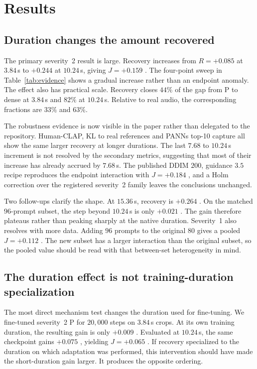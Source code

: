 \section{Results}
\subsection{Duration changes the amount recovered}
The primary severity~2 result is large. Recovery increases from $R=+0.085$  at $3.84$\,s to $+0.244$  at $10.24$\,s, giving $J=+0.159$ . The four-point sweep in Table~\ref{tab:evidence} shows a gradual increase rather than an endpoint anomaly. The effect also has practical scale. Recovery closes $44\%$ of the gap from P to dense at $3.84$\,s and $82\%$ at $10.24$\,s. Relative to real audio, the corresponding fractions are $33\%$ and $63\%$.

The robustness evidence is now visible in the paper rather than delegated to the repository. Human-CLAP, KL to real references and PANNs top-10 capture all show the same larger recovery at longer durations. The last $7.68$ to $10.24$\,s increment is not resolved by the secondary metrics, suggesting that most of their increase has already accrued by $7.68$\,s. The published DDIM $200$, guidance $3.5$ recipe reproduces the endpoint interaction with $J=+0.184$ , and a Holm correction over the registered severity~2 family leaves the conclusions unchanged.

Two follow-ups clarify the shape. At $15.36$\,s, recovery is $+0.264$ . On the matched $96$-prompt subset, the step beyond $10.24$\,s is only $+0.021$ . The gain therefore plateaus rather than peaking sharply at the native duration. Severity~1 also resolves with more data. Adding $96$ prompts to the original $80$ gives a pooled $J=+0.112$ . The new subset has a larger interaction than the original subset, so the pooled value should be read with that between-set heterogeneity in mind.

\subsection{The duration effect is not training-duration specialization}
The most direct mechanism test changes the duration used for fine-tuning. We fine-tuned severity~2 P for $20{,}000$ steps on $3.84$\,s crops. At its own training duration, the resulting gain is only $+0.009$ . Evaluated at $10.24$\,s, the same checkpoint gains $+0.075$ , yielding $J=+0.065$ . If recovery specialized to the duration on which adaptation was performed, this intervention should have made the short-duration gain larger. It produces the opposite ordering.

